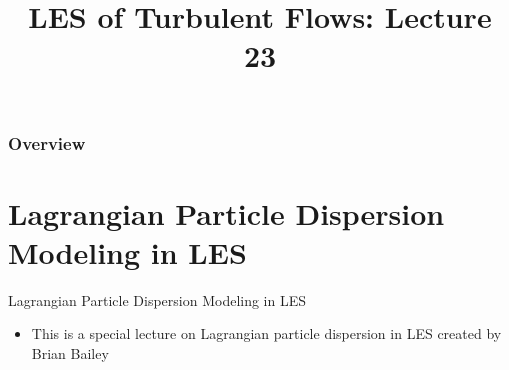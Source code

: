  
\title{LES of Turbulent Flows: Lecture 23}
\usepackage{pdfpages}



\begin{frame} 
  \titlepage
\end{frame}


\begin{frame}
\frametitle{Overview}
\tableofcontents
\end{frame}

\section{Lagrangian Particle Dispersion Modeling in LES} %
\begin{frame}{Lagrangian Particle Dispersion Modeling in LES}
\begin{itemize}
	\item This is a special lecture on Lagrangian particle dispersion in LES created by Brian Bailey
\end{itemize}
\end{frame}



